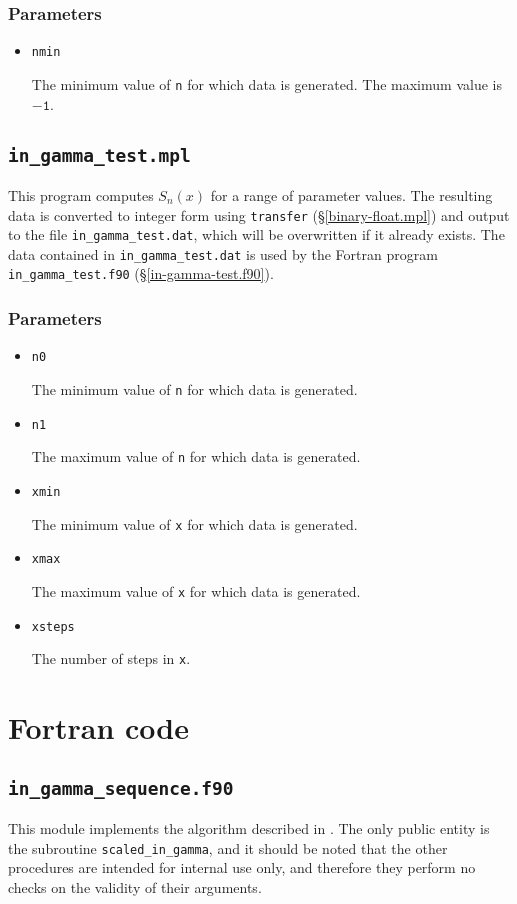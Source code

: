 \documentclass[paper=a4,smallheadings]{scrartcl}
\newcommand\iitem[1]{\item \texttt{#1} \par}
\begin{document}
\subsubsection*{Parameters}
\begin{itemize}
\iitem{nmin} The minimum value of \texttt{n} for which data is
generated. The maximum value is $\mathtt{-1}$.
\end{itemize}
%
\subsection{\texttt{in\_gamma\_test.mpl}}
\label{in-gamma-test.mpl}
This program computes $S_n(x)$ for a range of parameter
values. The resulting data is converted to integer form using
\texttt{transfer} (\S\ref{binary-float.mpl}) and output to the file
\texttt{in\_gamma\_test.dat}, which will be overwritten if it already
exists. The data contained in \texttt{in\_gamma\_test.dat} is used by
the Fortran program \texttt{in\_gamma\_test.f90}
(\S\ref{in-gamma-test.f90}).
%
\subsubsection*{Parameters}
\begin{itemize}
\iitem{n0}
The minimum value of \texttt{n} for which data is generated.
\iitem{n1}
The maximum value of \texttt{n} for which data is generated.
\iitem{xmin}
The minimum value of \texttt{x} for which data is generated. 
\iitem{xmax}
The maximum value of \texttt{x} for which data is generated.
\iitem{xsteps}
The number of steps in \texttt{x}.
\end{itemize}

\section{Fortran code}
\subsection{\texttt{in\_gamma\_sequence.f90}}
\label{in-gamma-sequence.f90}
This module implements the algorithm described in \cite{Thompson11b}.
The only public entity is the subroutine \texttt{scaled\_in\_gamma},
and it should be noted that the other procedures are intended for
internal use only, and therefore they perform no checks on the
validity of their arguments.
%
\end{document}
